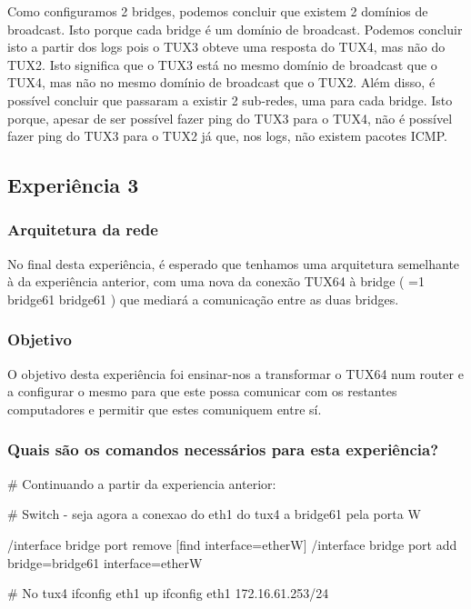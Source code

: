\documentclass[11pt,a4paper]{article}
\newcommand{\hl}[2][1]{%
  \ifnum#1=1\relax
    \textcolor{text-hl1}{#2}%
  \else
    \textcolor{text-hl2}{#2}%
  \fi
}
\begin{document}
\begin{multicols}{2}
Como configuramos 2 bridges, podemos concluir que existem 2 domínios de broadcast. Isto porque cada bridge é um domínio de broadcast. Podemos concluir isto a partir dos logs pois o TUX3 obteve uma resposta do TUX4, mas não do TUX2. Isto significa que o TUX3 está no mesmo domínio de broadcast que o TUX4, mas não no mesmo domínio de broadcast que o TUX2.
Além disso, é possível concluir que passaram a existir 2 sub-redes, uma para cada bridge. Isto porque, apesar de ser possível fazer ping do TUX3 para o TUX4, não é possível fazer ping do TUX3 para o TUX2 já que, nos logs, não existem pacotes ICMP.

\subsection{Experiência 3}

\subsubsection{Arquitetura da rede}

No final desta experiência, é esperado que tenhamos uma arquitetura semelhante à da experiência anterior, com uma nova da conexão TUX64 à bridge (\hl{bridge61}) que mediará a comunicação entre as duas bridges.

\subsubsection{Objetivo}

O objetivo desta experiência foi ensinar-nos a transformar o TUX64 num router e a configurar o mesmo para que este possa comunicar com os restantes computadores e permitir que estes comuniquem entre sí.

\subsubsection{Quais são os comandos necessários para esta experiência?}

\begin{bash-darktheme}
        # Continuando a partir da experiencia anterior:

        # Switch - seja agora a conexao do eth1 do tux4 a bridge61 pela porta W

        /interface bridge port remove [find interface=etherW]
        /interface bridge port add bridge=bridge61 interface=etherW

        # No tux4
        ifconfig eth1 up
        ifconfig eth1 172.16.61.253/24


\end{bash-darktheme}
\end{multicols}
\end{document}
